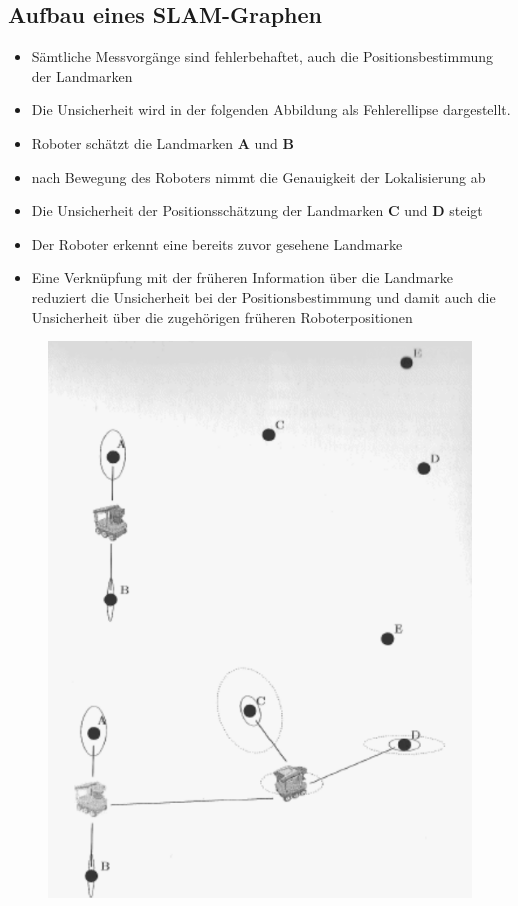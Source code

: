 \subsection{Aufbau eines SLAM-Graphen}
\begin{itemize}
	\item Sämtliche Messvorgänge sind fehlerbehaftet, auch die Positionsbestimmung der Landmarken
	\item Die Unsicherheit wird in der folgenden Abbildung als Fehlerellipse dargestellt.
	\item Roboter schätzt die Landmarken \textbf{A} und \textbf{B}
	\item nach Bewegung des Roboters nimmt die Genauigkeit der Lokalisierung ab
	\item Die Unsicherheit der Positionsschätzung der Landmarken \textbf{C} und \textbf{D} steigt
	\item Der Roboter erkennt eine bereits zuvor gesehene Landmarke
	\item Eine Verknüpfung mit der früheren Information über die Landmarke reduziert die Unsicherheit bei der Positionsbestimmung und damit auch die Unsicherheit über die zugehörigen früheren Roboterpositionen
\end{itemize}
\begin{minipage}[]{0.5\textwidth}
\begin{figure}[H]
	\begin{center}
		\includegraphics[scale=0.52]{Resources/PNG/LandmarkenBeispiel.PNG}
		\caption{}
		\label{fig:PNG/LandmarkenBeispiel.PNG}
	\end{center}
\end{figure}
\end{minipage}
